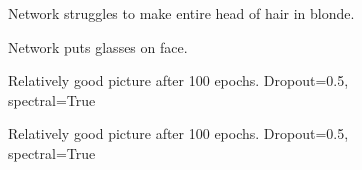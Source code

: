 \documentclass[12pt, a4paper]{article}
\begin{document}
\begin{figure}
    \caption{Network struggles to make entire head of hair in blonde.}
    \label{fig:blonde}
\end{figure}
\begin{figure}
    \caption{Network puts glasses on face.}
    \label{fig:sunglasses}
\end{figure}
\begin{figure}
    \caption{Relatively good picture after 100 epochs. Dropout=0.5, spectral=True}
    \label{fig:relgood1}
\end{figure}
\begin{figure}
    \caption{Relatively good picture after 100 epochs. Dropout=0.5, spectral=True}
    \label{fig:relgood2}
\end{figure}
\end{document}
